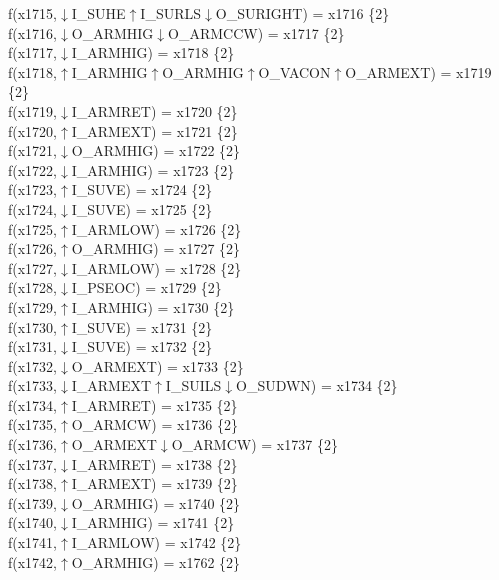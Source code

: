 f(x1715,$\downarrow$I\_SUHE$\uparrow$I\_SURLS$\downarrow$O\_SURIGHT) = x1716 \{2\} \\  
f(x1716,$\downarrow$O\_ARMHIG$\downarrow$O\_ARMCCW) = x1717 \{2\} \\  
f(x1717,$\downarrow$I\_ARMHIG) = x1718 \{2\} \\  
f(x1718,$\uparrow$I\_ARMHIG$\uparrow$O\_ARMHIG$\uparrow$O\_VACON$\uparrow$O\_ARMEXT) = x1719 \{2\} \\  
f(x1719,$\downarrow$I\_ARMRET) = x1720 \{2\} \\  
f(x1720,$\uparrow$I\_ARMEXT) = x1721 \{2\} \\  
f(x1721,$\downarrow$O\_ARMHIG) = x1722 \{2\} \\  
f(x1722,$\downarrow$I\_ARMHIG) = x1723 \{2\} \\  
f(x1723,$\uparrow$I\_SUVE) = x1724 \{2\} \\  
f(x1724,$\downarrow$I\_SUVE) = x1725 \{2\} \\  
f(x1725,$\uparrow$I\_ARMLOW) = x1726 \{2\} \\  
f(x1726,$\uparrow$O\_ARMHIG) = x1727 \{2\} \\  
f(x1727,$\downarrow$I\_ARMLOW) = x1728 \{2\} \\  
f(x1728,$\downarrow$I\_PSEOC) = x1729 \{2\} \\  
f(x1729,$\uparrow$I\_ARMHIG) = x1730 \{2\} \\  
f(x1730,$\uparrow$I\_SUVE) = x1731 \{2\} \\  
f(x1731,$\downarrow$I\_SUVE) = x1732 \{2\} \\  
f(x1732,$\downarrow$O\_ARMEXT) = x1733 \{2\} \\  
f(x1733,$\downarrow$I\_ARMEXT$\uparrow$I\_SUILS$\downarrow$O\_SUDWN) = x1734 \{2\} \\  
f(x1734,$\uparrow$I\_ARMRET) = x1735 \{2\} \\  
f(x1735,$\uparrow$O\_ARMCW) = x1736 \{2\} \\  
f(x1736,$\uparrow$O\_ARMEXT$\downarrow$O\_ARMCW) = x1737 \{2\} \\  
f(x1737,$\downarrow$I\_ARMRET) = x1738 \{2\} \\  
f(x1738,$\uparrow$I\_ARMEXT) = x1739 \{2\} \\  
f(x1739,$\downarrow$O\_ARMHIG) = x1740 \{2\} \\  
f(x1740,$\downarrow$I\_ARMHIG) = x1741 \{2\} \\  
f(x1741,$\uparrow$I\_ARMLOW) = x1742 \{2\} \\  
f(x1742,$\uparrow$O\_ARMHIG) = x1762 \{2\} \\  
